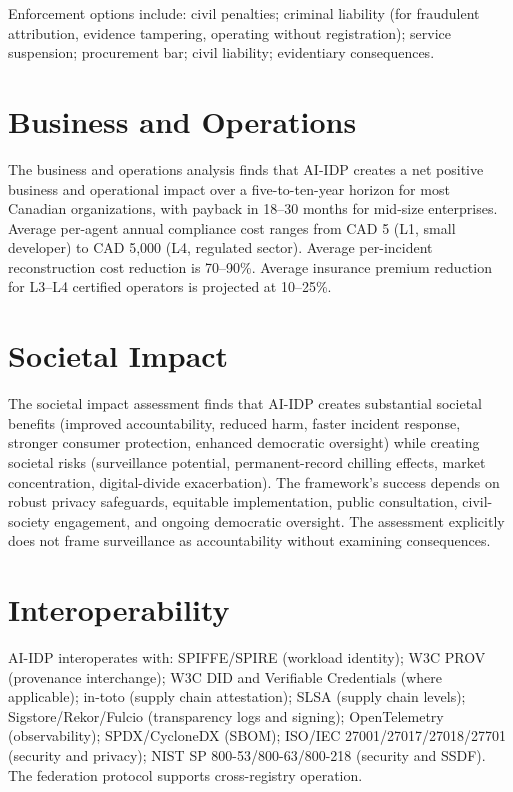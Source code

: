 \documentclass[11pt,a4paper]{article}
\begin{document}
Enforcement options include: civil penalties; criminal liability (for fraudulent attribution, evidence tampering, operating without registration); service suspension; procurement bar; civil liability; evidentiary consequences.

\section{Business and Operations}
\label{sec:business}

The business and operations analysis finds that AI-IDP creates a net positive business and operational impact over a five-to-ten-year horizon for most Canadian organizations, with payback in 18--30 months for mid-size enterprises. Average per-agent annual compliance cost ranges from CAD 5 (L1, small developer) to CAD 5,000 (L4, regulated sector). Average per-incident reconstruction cost reduction is 70--90\%. Average insurance premium reduction for L3--L4 certified operators is projected at 10--25\%.

\section{Societal Impact}
\label{sec:societal-impact}

The societal impact assessment finds that AI-IDP creates substantial societal benefits (improved accountability, reduced harm, faster incident response, stronger consumer protection, enhanced democratic oversight) while creating societal risks (surveillance potential, permanent-record chilling effects, market concentration, digital-divide exacerbation). The framework's success depends on robust privacy safeguards, equitable implementation, public consultation, civil-society engagement, and ongoing democratic oversight. The assessment explicitly does not frame surveillance as accountability without examining consequences.

\section{Interoperability}
\label{sec:interoperability}

AI-IDP interoperates with: SPIFFE/SPIRE (workload identity); W3C PROV (provenance interchange); W3C DID and Verifiable Credentials (where applicable); in-toto (supply chain attestation); SLSA (supply chain levels); Sigstore/Rekor/Fulcio (transparency logs and signing); OpenTelemetry (observability); SPDX/CycloneDX (SBOM); ISO/IEC 27001/27017/27018/27701 (security and privacy); NIST SP 800-53/800-63/800-218 (security and SSDF). The federation protocol supports cross-registry operation.
\end{document}
